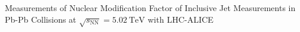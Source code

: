 \documentclass[11pt,a4paper]{article}
\begin{document}
\begin{center}
	Measurements of Nuclear Modification Factor of Inclusive Jet Measurements 
	in Pb-Pb Collisions at $\sqrt{s_\mathrm{NN}} = 5.02~\mathrm{TeV}$ with LHC-ALICE
\end{center}




\vspace{-10mm}

\end{document}
